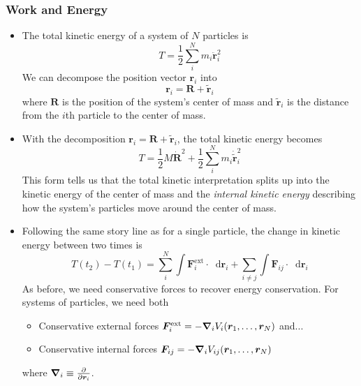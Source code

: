 \documentclass[11pt, a4paper]{article}
\newcommand{\diff}{\mathop{}\!\mathrm{d}} %
\newcommand{\bdot}[1]{\dot{\bm{#1}}} %
\newcommand{\bddot}[1]{\ddot{\bm{#1}}} %
\begin{document}
\subsubsection{Work and Energy}
\begin{itemize}
	\item The total kinetic energy of a system of $ N $ particles is 
	\begin{equation*}
		T = \frac{1}{2}\sum_{i}^{N}m_{i}\bddot{r}_{i}^{2}
	\end{equation*}
	We can decompose the position vector $ \bm{r}_{i} $ into
	\begin{equation*}
		\bm{r}_{i} = \bm{R} + \tilde{\bm{r}}_{i}
	\end{equation*}
	where $ \bm{R} $ is the position of the system's center of mass and $ \tilde{\bm{r}}_{i} $ is the distance from the $ i $th particle to the center of mass.
	
	\item With the decomposition $ \bm{r}_{i} = \bm{R} + \tilde{\bm{r}}_{i} $, the total kinetic energy becomes
	\begin{equation*}
		T = \frac{1}{2}M \bdot{R}^{2} + \frac{1}{2}\sum_{i}^{N}m_{i}\dot{\tilde{\bm{r}}}_{i}^{2}
	\end{equation*}
	This form tells us that the total kinetic interpretation splits up into the kinetic energy of the center of mass and the \textit{internal kinetic energy} describing how the system's particles move around the center of mass.
	
	\item Following the same story line as for a single particle, the change in kinetic energy between two times is
	\begin{equation*}
		T(t_{2}) - T(t_{1}) = \sum_{i}^{N} \int \bm{F}^{\text{ext}}_{i} \cdot \diff \bm{r}_{i} + \sum_{i\neq j} \int \bm{F}_{ij} \cdot \diff \bm{r}_{i} 
	\end{equation*}
	As before, we need conservative forces to recover energy conservation. For systems of particles, we need both
	\begin{itemize}
	\item Conservative external forces $ \bm{F}^{\text{ext}}_{i} = - \grad_{i}V_{i}(\bm{r}_{1}, \ldots, \bm{r}_{N}) $ and...
	\item Conservative internal forces $ \bm{F}_{ij} = - \grad_{i}V_{ij}(\bm{r}_{1}, \ldots, \bm{r}_{N}) $
	\end{itemize}
	where $ \grad_{i} \equiv \pdv{}{\bm{r}_{i}} $. 
	

\end{itemize}
\end{document}
